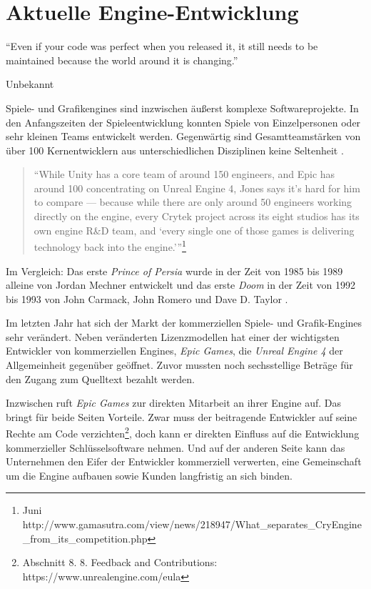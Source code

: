 \chapter{Aktuelle Engine-Entwicklung}
\label{chap:engine-uebersicht}

\epigraph{"`Even if your code was perfect when you released it, it still needs to be maintained because the world around it is changing."'}{Unbekannt}

Spiele- und Grafikengines sind inzwischen äußerst komplexe Softwareprojekte. In den Anfangszeiten der Spieleentwicklung konnten Spiele von Einzelpersonen oder sehr kleinen Teams entwickelt werden. Gegenwärtig sind Gesamtteamstärken von über 100 Kernentwicklern aus unterschiedlichen Disziplinen keine Seltenheit \parencite[Kapitel 8, Abschnitt: "`The Problem with Large Teams"']{keith2010agile}.

\begin{quote}
% 
"`While Unity has a core team of around 150 engineers, and Epic has around 100 concentrating on Unreal Engine 4, Jones says it's hard for him to compare --- because while there are only around 50 engineers working directly on the engine, every Crytek project across its eight studios has its own engine R\&D team, and `every single one of those games is delivering technology back into the engine.'"'\footnote{Juni http://www.gamasutra.com/view/news/218947/What\_separates\_CryEngine\_from\_its\_competition.php}
\end{quote}

Im Vergleich: Das erste \textit{Prince of Persia} wurde in der Zeit von 1985 bis 1989 alleine von Jordan Mechner entwickelt \parencite{Mechner1993} und das erste \textit{Doom} in der Zeit von 1992 bis 1993 von John Carmack, John Romero und Dave D. Taylor \parencite{Kushner2003}.

Im letzten Jahr hat sich der Markt der kommerziellen Spiele- und Grafik-Engines sehr verändert. Neben veränderten Lizenzmodellen hat einer der wichtigsten Entwickler von kommerziellen Engines, \textit{Epic Games}, die \textit{Unreal Engine 4} der Allgemeinheit gegenüber geöffnet. Zuvor mussten noch sechsstellige Beträge für den Zugang zum Quelltext bezahlt werden. 

Inzwischen ruft \textit{Epic Games} zur direkten Mitarbeit an ihrer Engine auf. Das bringt für beide Seiten Vorteile. Zwar muss der beitragende Entwickler auf seine Rechte am Code verzichten\footnote{Abschnitt 8. 8. Feedback and Contributions: https://www.unrealengine.com/eula}, doch kann er direkten Einfluss auf die Entwicklung kommerzieller Schlüsselsoftware nehmen. Und auf der anderen Seite kann das Unternehmen den Eifer der Entwickler kommerziell verwerten, eine Gemeinschaft um die Engine aufbauen sowie Kunden langfristig an sich binden.


